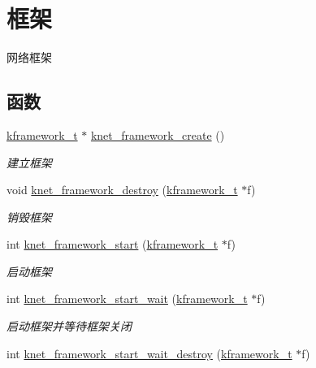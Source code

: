 \hypertarget{a00106}{}\section{框架}
\label{a00106}


网络框架  


\subsection*{函数}
\begin{DoxyCompactItemize}
\item 
\hyperlink{a00053_a3195a3be35782fc1efb920c811be111d_a3195a3be35782fc1efb920c811be111d}{kframework\+\_\+t} $\ast$ \hyperlink{a00106_ga066683c6d9defb4121552b439d11d7ba_ga066683c6d9defb4121552b439d11d7ba}{knet\+\_\+framework\+\_\+create} ()
\begin{DoxyCompactList}\small\item\em 建立框架 \end{DoxyCompactList}\item 
void \hyperlink{a00106_gaee7016dea12793dae5e6732fb86ee8d0_gaee7016dea12793dae5e6732fb86ee8d0}{knet\+\_\+framework\+\_\+destroy} (\hyperlink{a00053_a3195a3be35782fc1efb920c811be111d_a3195a3be35782fc1efb920c811be111d}{kframework\+\_\+t} $\ast$f)
\begin{DoxyCompactList}\small\item\em 销毁框架 \end{DoxyCompactList}\item 
int \hyperlink{a00106_gae2bea4af82f4cdce2f4efbf68aa8054c_gae2bea4af82f4cdce2f4efbf68aa8054c}{knet\+\_\+framework\+\_\+start} (\hyperlink{a00053_a3195a3be35782fc1efb920c811be111d_a3195a3be35782fc1efb920c811be111d}{kframework\+\_\+t} $\ast$f)
\begin{DoxyCompactList}\small\item\em 启动框架 \end{DoxyCompactList}\item 
int \hyperlink{a00106_ga5eda19f3b32bb48578cf735e877aac2e_ga5eda19f3b32bb48578cf735e877aac2e}{knet\+\_\+framework\+\_\+start\+\_\+wait} (\hyperlink{a00053_a3195a3be35782fc1efb920c811be111d_a3195a3be35782fc1efb920c811be111d}{kframework\+\_\+t} $\ast$f)
\begin{DoxyCompactList}\small\item\em 启动框架并等待框架关闭 \end{DoxyCompactList}\item 
int \hyperlink{a00106_gab44f183a42eda626fe6ec1e6d35bb859_gab44f183a42eda626fe6ec1e6d35bb859}{knet\+\_\+framework\+\_\+start\+\_\+wait\+\_\+destroy} (\hyperlink{a00053_a3195a3be35782fc1efb920c811be111d_a3195a3be35782fc1efb920c811be111d}{kframework\+\_\+t} $\ast$f)

\end{DoxyCompactItemize}
